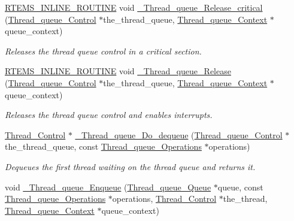 \begin{DoxyCompactItemize}
\mbox{\hyperlink{group__RTEMSScoreBaseDefs_gac216239df231d5dbd15e3520b0b9313f}{R\+T\+E\+M\+S\+\_\+\+I\+N\+L\+I\+N\+E\+\_\+\+R\+O\+U\+T\+I\+NE}} void \mbox{\hyperlink{group__RTEMSScoreThreadQueue_ga5f0796c03f91beaa6caa842433122bab}{\+\_\+\+Thread\+\_\+queue\+\_\+\+Release\+\_\+critical}} (\mbox{\hyperlink{structThread__queue__Control}{Thread\+\_\+queue\+\_\+\+Control}} $\ast$the\+\_\+thread\+\_\+queue, \mbox{\hyperlink{structThread__queue__Context}{Thread\+\_\+queue\+\_\+\+Context}} $\ast$queue\+\_\+context)
\begin{DoxyCompactList}\small\item\em Releases the thread queue control in a critical section. \end{DoxyCompactList}\item 
\mbox{\hyperlink{group__RTEMSScoreBaseDefs_gac216239df231d5dbd15e3520b0b9313f}{R\+T\+E\+M\+S\+\_\+\+I\+N\+L\+I\+N\+E\+\_\+\+R\+O\+U\+T\+I\+NE}} void \mbox{\hyperlink{group__RTEMSScoreThreadQueue_ga0a8881ef4106a0707b2751cdd3d18bef}{\+\_\+\+Thread\+\_\+queue\+\_\+\+Release}} (\mbox{\hyperlink{structThread__queue__Control}{Thread\+\_\+queue\+\_\+\+Control}} $\ast$the\+\_\+thread\+\_\+queue, \mbox{\hyperlink{structThread__queue__Context}{Thread\+\_\+queue\+\_\+\+Context}} $\ast$queue\+\_\+context)
\begin{DoxyCompactList}\small\item\em Releases the thread queue control and enables interrupts. \end{DoxyCompactList}\item 
\mbox{\hyperlink{struct__Thread__Control}{Thread\+\_\+\+Control}} $\ast$ \mbox{\hyperlink{group__RTEMSScoreThreadQueue_ga1671707d42e9a381c3737b58deed97d5}{\+\_\+\+Thread\+\_\+queue\+\_\+\+Do\+\_\+dequeue}} (\mbox{\hyperlink{structThread__queue__Control}{Thread\+\_\+queue\+\_\+\+Control}} $\ast$the\+\_\+thread\+\_\+queue, const \mbox{\hyperlink{structThread__queue__Operations}{Thread\+\_\+queue\+\_\+\+Operations}} $\ast$operations)
\begin{DoxyCompactList}\small\item\em Dequeues the first thread waiting on the thread queue and returns it. \end{DoxyCompactList}\item 
void \mbox{\hyperlink{group__RTEMSScoreThreadQueue_ga4992b40810f6d287c832bdad240dbc90}{\+\_\+\+Thread\+\_\+queue\+\_\+\+Enqueue}} (\mbox{\hyperlink{structThread__queue__Queue}{Thread\+\_\+queue\+\_\+\+Queue}} $\ast$queue, const \mbox{\hyperlink{structThread__queue__Operations}{Thread\+\_\+queue\+\_\+\+Operations}} $\ast$operations, \mbox{\hyperlink{struct__Thread__Control}{Thread\+\_\+\+Control}} $\ast$the\+\_\+thread, \mbox{\hyperlink{structThread__queue__Context}{Thread\+\_\+queue\+\_\+\+Context}} $\ast$queue\+\_\+context)

\end{DoxyCompactItemize}
